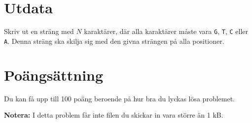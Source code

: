 \section*{Utdata}
\noindent
Skriv ut en sträng med $N$ karaktärer, där alla karaktärer måste vara \texttt{G}, \texttt{T}, \texttt{C} eller \texttt{A}. 
Denna sträng ska skilja sig med den givna strängen på alla positioner.



\section*{Poängsättning}
Du kan få upp till 100 poäng beroende på hur bra du lyckas lösa problemet.

\textbf{Notera:} I detta problem får inte filen du skickar in vara större än 1 kB.

